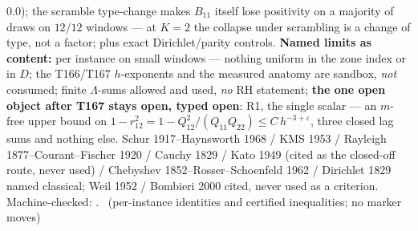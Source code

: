 \documentclass[11pt,a4paper]{article}
\theoremstyle{definition}
\begin{document}
$0.0$); the scramble type-change makes $B_{11}$ itself lose positivity
on a majority of draws on $12/12$ windows --- at $K=2$ the collapse
under scrambling is a change of type, not a factor; plus exact
Dirichlet/parity controls.
\textbf{Named limits as content:} per instance on small windows ---
nothing uniform in the zone index or in $D$; the T166/T167 $h$-exponents
and the measured anatomy are sandbox, \emph{not} consumed; finite
$\Lambda$-sums allowed and used, \emph{no} RH statement; \textbf{the one
open object after T167 stays open, typed open}: R1, the single scalar
--- an $m$-free upper bound on
$1-r_{12}^2=1-Q_{12}^2/(Q_{11}Q_{22})\le C\,h^{-3+\varepsilon}$, three
closed lag sums and nothing else.
Schur 1917--Haynsworth 1968 / KMS 1953 / Rayleigh 1877--Courant--Fischer
1920 / Cauchy 1829 / Kato 1949 (cited as the closed-off route, never
used) / Chebyshev 1852--Rosser--Schoenfeld 1962 / Dirichlet 1829 named
classical; Weil 1952 / Bombieri 2000 cited, never used as a criterion.
Machine-checked:
.
\mE\ (per-instance identities and certified inequalities; no marker moves)
\end{document}
